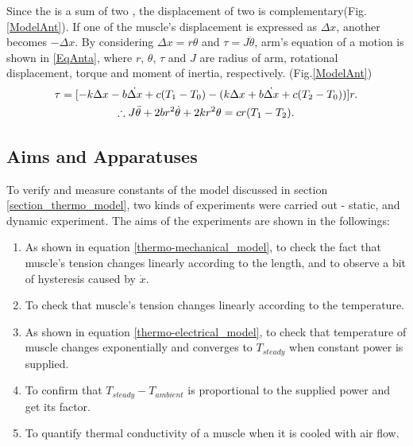 Since the \anta is a sum of two \scpsnospace, the displacement of two \scps is complementary(Fig.\ref{ModelAnt}). If one of the muscle's displacement is expressed as $\Delta{x}$, another becomes $-\Delta{x}$. By considering $\Delta{x}=r\theta$ and $\tau=J\ddot{\theta}$, arm's equation of a motion is shown in \eqref{EqAnta}, where $r$, $\theta$, $\tau$ and $J$ are radius of arm, rotational displacement, torque and moment of inertia, respectively.
(Fig.\ref{ModelAnt})
\begin{gather}
\tau = [-k\Delta x-b\dot{\Delta x}+c(T_1-T_0) - (k\Delta x+b\dot{\Delta x}+c(T_2-T_0))]r. \notag \\
\therefore J\ddot{\theta}+2br^2\dot{\theta}+2kr^2\theta = cr(T_1-T_2). \label{EqAnta}
\end{gather}

\subsection{Aims and Apparatuses}\label{section_aimsappa}
To verify and measure constants of the model discussed in section \ref{section_thermo_model}, two kinds of experiments were carried out - static, and dynamic experiment. The aims of the experiments are shown in the followings:

\begin{enumerate} 
\item As shown in equation \eqref{thermo-mechanical_model}, to check the fact that muscle's tension changes linearly according to the length, and to observe a bit of hysteresis caused by $\dot{x}$.
\item To check that muscle's tension changes linearly according to the temperature.
\item As shown in equation \eqref{thermo-electrical_model}, to check that temperature of muscle changes exponentially and converges to $T_{steady}$ when constant power is supplied.
\item To confirm that $T_{steady}-T_{ambient}$ is proportional to the supplied power and get its factor. 
\item To quantify thermal conductivity of a muscle when it is cooled with air flow.
\end{enumerate}

